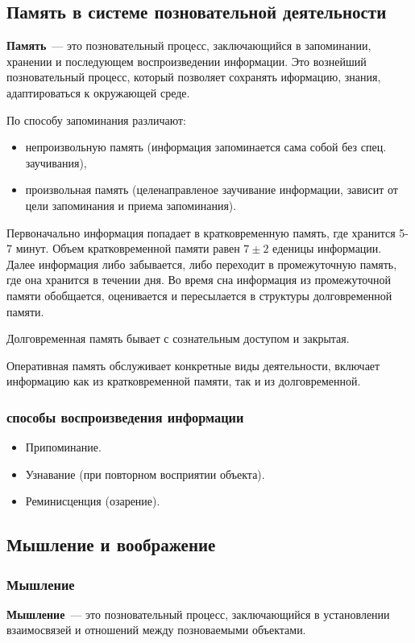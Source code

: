 \subsection{Память в системе позновательной деятельности}
\textbf{Память}~--- это позновательный процесс, заключающийся в запоминании, хранении и последующем воспроизведении информации. Это вознейший позновательный процесс, который позволяет сохранять иформацию, знания, адаптироваться к окружающей среде.

По способу запоминания различают:
\begin{itemize}
	\item непроизвольную память (информация запоминается сама собой без спец. заучивания),
	\item произвольная память (целенаправленое заучивание информации, зависит от цели запоминания и приема запоминания).
\end{itemize}

Первоначально информация попадает в кратковременную память, где хранится 5-7 минут. Объем кратковременной памяти равен $7\pm2$ еденицы информации. Далее информация либо забывается, либо переходит в промежуточную память, где она хранится в течении дня. Во время сна информация из промежуточной памяти обобщается, оценивается и пересылается в структуры долговременной памяти.

Долговременная память бывает  с сознательным доступом и закрытая.

Оперативная память обслуживает конкретные виды деятельности, включает информацию как из кратковременной памяти, так и из долговременной.

\subsubsection{способы воспроизведения информации}
\begin{itemize}
	\item Припоминание.
	\item Узнавание (при повторном восприятии объекта).
	\item Реминисценция (озарение).
\end{itemize}

\subsection{Мышление и воображение}
\subsubsection{Мышление}
\textbf{Мышление}~--- это позновательный процесс, заключающийся в установлении взаимосвязей и отношений между позноваемыми объектами.


